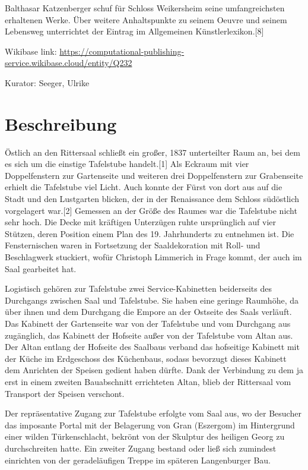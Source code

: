 \documentclass[
  letterpaper,
]{book}
\begin{document}
Balthasar Katzenberger schuf für Schloss Weikersheim seine
umfangreichsten erhaltenen Werke. Über weitere Anhaltspunkte zu seinem
Oeuvre und seinem Lebensweg unterrichtet der Eintrag im Allgemeinen
Künstlerlexikon.{[}8{]}

Wikibase link:
\url{https://computational-publishing-service.wikibase.cloud/entity/Q232}

Kurator: Seeger, Ulrike

\section{Beschreibung}\label{beschreibung}

Östlich an den Rittersaal schließt ein großer, 1837 unterteilter Raum
an, bei dem es sich um die einstige Tafelstube handelt.{[}1{]} Als
Eckraum mit vier Doppelfenstern zur Gartenseite und weiteren drei
Doppelfenstern zur Grabenseite erhielt die Tafelstube viel Licht. Auch
konnte der Fürst von dort aus auf die Stadt und den Lustgarten blicken,
der in der Renaissance dem Schloss südöstlich vorgelagert war.{[}2{]}
Gemessen an der Größe des Raumes war die Tafelstube nicht sehr hoch. Die
Decke mit kräftigen Unterzügen ruhte ursprünglich auf vier Stützen,
deren Position einem Plan des 19. Jahrhunderts zu entnehmen ist. Die
Fensternischen waren in Fortsetzung der Saaldekoration mit Roll- und
Beschlagwerk stuckiert, wofür Christoph Limmerich in Frage kommt, der
auch im Saal gearbeitet hat.

Logistisch gehören zur Tafelstube zwei Service-Kabinetten beiderseits
des Durchgangs zwischen Saal und Tafelstube. Sie haben eine geringe
Raumhöhe, da über ihnen und dem Durchgang die Empore an der Ostseite des
Saals verläuft. Das Kabinett der Gartenseite war von der Tafelstube und
vom Durchgang aus zugänglich, das Kabinett der Hofseite außer von der
Tafelstube vom Altan aus. Der Altan entlang der Hofseite des Saalbaus
verband das hofseitige Kabinett mit der Küche im Erdgeschoss des
Küchenbaus, sodass bevorzugt dieses Kabinett dem Anrichten der Speisen
gedient haben dürfte. Dank der Verbindung zu dem ja erst in einem
zweiten Bauabschnitt errichteten Altan, blieb der Rittersaal vom
Transport der Speisen verschont.

Der repräsentative Zugang zur Tafelstube erfolgte vom Saal aus, wo der
Besucher das imposante Portal mit der Belagerung von Gran (Eszergom) im
Hintergrund einer wilden Türkenschlacht, bekrönt von der Skulptur des
heiligen Georg zu durchschreiten hatte. Ein zweiter Zugang bestand oder
ließ sich zumindest einrichten von der geradeläufigen Treppe im späteren
Langenburger Bau.
\end{document}
